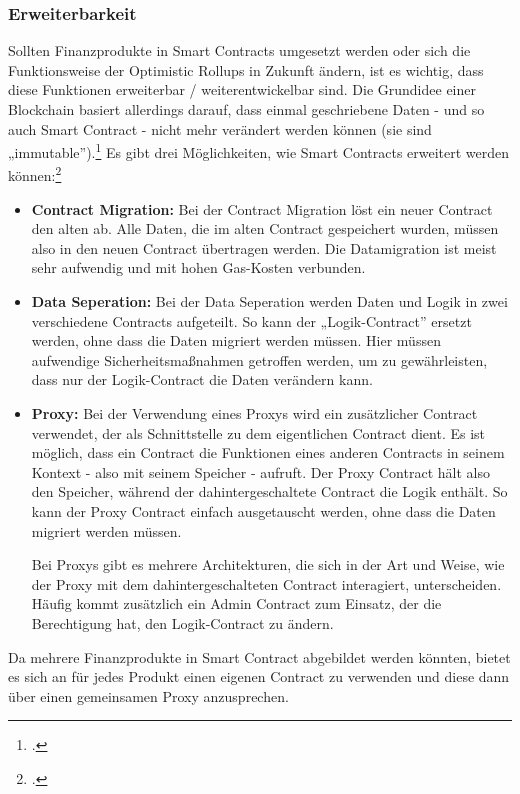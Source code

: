 \subsubsection{Erweiterbarkeit}
\label{sec:Erweiterbarkeit}

Sollten Finanzprodukte in Smart Contracts umgesetzt werden oder sich die Funktionsweise der Optimistic Rollups in Zukunft ändern, ist es wichtig, dass diese Funktionen erweiterbar / weiterentwickelbar sind.
Die Grundidee einer Blockchain basiert allerdings darauf, dass einmal geschriebene Daten - und so auch Smart Contract - nicht mehr verändert werden können (sie sind „immutable”).\footcite[Vgl.][]{w30}
Es gibt drei Möglichkeiten, wie Smart Contracts erweitert werden können:\footcite[Vgl. hierzu und zum Folgenden sowie weiterführend][]{w29}
\begin{itemize}
    \item \textbf{Contract Migration:}
    Bei der Contract Migration löst ein neuer Contract den alten ab.
    Alle Daten, die im alten Contract gespeichert wurden, müssen also in den neuen Contract übertragen werden.
    Die Datamigration ist meist sehr aufwendig und mit hohen Gas-Kosten verbunden.

    \item \textbf{Data Seperation:}
    Bei der Data Seperation werden Daten und Logik in zwei verschiedene Contracts aufgeteilt.
    So kann der „Logik-Contract” ersetzt werden, ohne dass die Daten migriert werden müssen.
    Hier müssen aufwendige Sicherheitsmaßnahmen getroffen werden, um zu gewährleisten, dass nur der Logik-Contract die Daten verändern kann.

    \item \textbf{Proxy:}
    Bei der Verwendung eines Proxys wird ein zusätzlicher Contract verwendet, der als Schnittstelle zu dem eigentlichen Contract dient.
    Es ist möglich, dass ein Contract die Funktionen eines anderen Contracts in seinem Kontext - also mit seinem Speicher - aufruft.
    Der Proxy Contract hält also den Speicher, während der dahintergeschaltete Contract die Logik enthält.
    So kann der Proxy Contract einfach ausgetauscht werden, ohne dass die Daten migriert werden müssen.

    \noindent
    Bei Proxys gibt es mehrere Architekturen, die sich in der Art und Weise, wie der Proxy mit dem dahintergeschalteten Contract interagiert, unterscheiden.
    Häufig kommt zusätzlich ein Admin Contract zum Einsatz, der die Berechtigung hat, den Logik-Contract zu ändern.
\end{itemize}

\noindent
Da mehrere Finanzprodukte in Smart Contract abgebildet werden könnten, bietet es sich an für jedes Produkt einen eigenen Contract zu verwenden und diese dann über einen gemeinsamen Proxy anzusprechen.